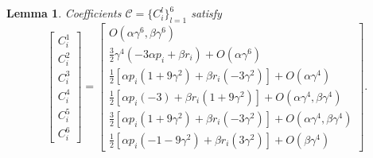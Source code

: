 \documentclass[11pt,letterpaper]{amsart}
\newtheorem{lemma}[theorem]{Lemma}
\theoremstyle{definition}
\theoremstyle{remark}
\numberwithin{equation}{section}
\begin{document}
\begin{lemma}\label{corfficient-g}
    Coefficients $\mathcal{C}=\{C^l_i\}_{l=1}^6$ satisfy
    \begin{equation*}
    \begin{bmatrix}
        C^1_i\\
        C^2_i\\
        C^3_i\\
        C^4_i\\
        C^5_i\\
        C^6_i
    \end{bmatrix}=\begin{bmatrix}
        O(\alpha\gamma^6,\beta\gamma^6)\\
        \frac{3}{2}\gamma^4\left( -3 \alpha p_i+\beta r_i\right)+O(\alpha\gamma^6)\\
        \frac{1}{2}\left[\alpha p_i(1+9\gamma^2)+\beta r_i(-3\gamma^2)\right]+O(\alpha\gamma^4)\\
        \frac{1}{2}\left[\alpha p_i(-3)+\beta r_i(1+9\gamma^2)\right]+O(\alpha\gamma^4,\beta\gamma^4)\\
        \frac{3}{2}\left[\alpha p_i(1+9\gamma^2)+\beta r_i(-3\gamma^2)\right]+O(\alpha\gamma^4,\beta\gamma^4)\\
       \frac{1}{2}\left[\alpha p_i(-1-9\gamma^2)+\beta r_i(3\gamma^2)\right]+O(\beta\gamma^4)
    \end{bmatrix}.
\end{equation*}
\end{lemma}
\end{document}
